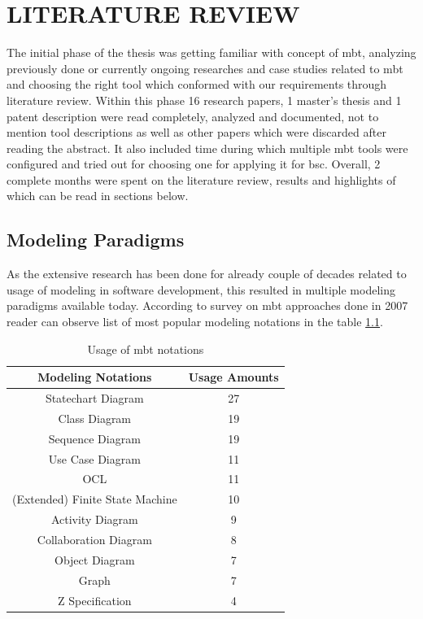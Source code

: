 \chapter{LITERATURE REVIEW}
\label{chapter:literature_review}

\par
The initial phase of the thesis was getting familiar with concept of \acrshort{mbt}, analyzing previously done or currently ongoing researches and case studies related to \acrshort{mbt} and choosing the right tool which conformed with our requirements through literature review. Within this phase 16 research papers, 1 master's thesis and 1 patent description were read completely, analyzed and documented, not to mention tool descriptions as well as other papers which were discarded after reading the abstract. It also included time during which multiple \acrshort{mbt} tools were configured and tried out for choosing one for applying it for \acrshort{bsc}. Overall, 2 complete months were spent on the literature review, results and highlights of which can be read in sections below.

\section{Modeling Paradigms}

\par
As the extensive research has been done for already couple of decades related to usage of modeling in software development, this resulted in multiple modeling paradigms available today. According to survey on \acrshort{mbt} approaches done in 2007 \cite{Survey} reader can observe list of most popular modeling notations in the table \ref{tab:Usage_Survey}. 

\begin{table}[]
    \centering
    \begin{tabular}{|c|c|}
        \hline
        Modeling Notations & Usage Amounts \\
        \hline
        Statechart Diagram & 27 \\
        \hline
        Class Diagram & 19 \\
        \hline
        Sequence Diagram & 19 \\
        \hline
        Use Case Diagram & 11 \\
        \hline
        OCL & 11 \\
        \hline
        (Extended) Finite State Machine & 10 \\
        \hline
        Activity Diagram & 9 \\
        \hline
        Collaboration Diagram & 8 \\
        \hline
        Object Diagram & 7 \\
        \hline
        Graph & 7 \\
        \hline
        Z Specification & 4 \\
        \hline
    \end{tabular}
    \caption{Usage of \acrshort{mbt} notations \cite{Survey}}
    \label{tab:Usage_Survey}
\end{table}

